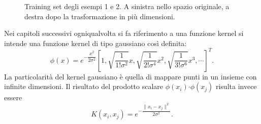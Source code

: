 \documentclass [11pt,a4paper,twoside,openright] {book}
\begin{document}
\begin{figure}[!h]
          \caption{Training set degli esempi 1 e 2. A sinistra nello spazio originale, a destra dopo la trasformazione in più dimensioni.}
\end{figure}\linebreak
Nei capitoli successivi ogniqualvolta si fa riferimento a una funzione kernel si intende una funzione kernel di tipo gaussiano \cite{vert2004primer} così definita:
\begin{equation}
\phi(x) = e^{-\dfrac{x^2}{2\sigma^2}} [1, \sqrt{\dfrac{1}{1! \sigma^2}}x, \sqrt{\dfrac{1}{2! \sigma^4}}x^2, \sqrt{\dfrac{1}{3!\sigma^6}}x^3, \cdots]^T.
\end{equation}
La particolarità del kernel gaussiano è quella di mappare punti in un insieme con infinite dimensioni. Il risultato del prodotto scalare $\phi(x_i) \boldsymbol{\cdot} \phi(x_j)$ risulta invece essere
\begin{equation}
K(x_i,x_j) = e^{-\dfrac{\parallel x_i - x_j \parallel^2}{2\sigma^2}}.
\end{equation}
\end{document}

